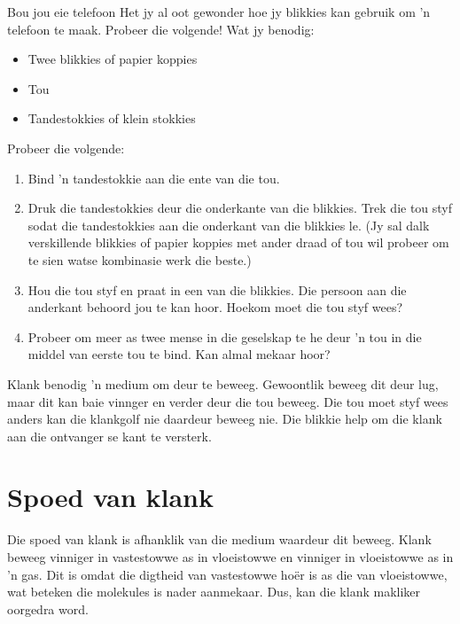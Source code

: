 	\par


\begin{activity}{Bou jou eie telefoon} 
Het jy al oot gewonder hoe jy blikkies kan gebruik om 'n telefoon te maak. Probeer die volgende!
Wat jy benodig:
\begin{itemize}
 \item Twee blikkies of papier koppies
  \item Tou
  \item Tandestokkies of klein stokkies
\end{itemize}

Probeer die volgende:
\begin{enumerate}[noitemsep, label=\textbf{\arabic*}. ] 
\item Bind 'n tandestokkie aan die ente van die tou. 
\item Druk die tandestokkies deur die onderkante van die blikkies. Trek die tou styf sodat die tandestokkies aan die onderkant van die blikkies le. (Jy sal dalk verskillende blikkies of papier koppies met ander draad of tou wil probeer om te sien watse kombinasie werk die beste.)
\item Hou die tou styf en praat in een van die blikkies. Die persoon aan die anderkant behoord jou te kan hoor. Hoekom moet die tou styf wees?
\item Probeer om meer as twee mense in die geselskap te he deur 'n tou in die middel van eerste tou te bind. Kan almal mekaar hoor?
\end{enumerate}
Klank benodig 'n medium om deur te beweeg. Gewoontlik beweeg dit deur lug, maar dit kan baie vinnger en verder deur die tou beweeg. Die tou moet styf wees anders kan die klankgolf nie daardeur beweeg nie. Die blikkie help om die klank aan die ontvanger se kant te versterk.	
\end{activity}

    \label{m38799*cid3}
            \section{Spoed van klank}
            \nopagebreak
Die spoed van klank is afhanklik van die medium waardeur dit beweeg. Klank beweeg vinniger in vastestowwe as in vloeistowwe en vinniger in vloeistowwe as in 'n gas. Dit is omdat die digtheid van vastestowwe ho\"{e}r is as die van vloeistowwe, wat beteken die molekules is nader aanmekaar. Dus, kan die klank makliker oorgedra word.\par 

